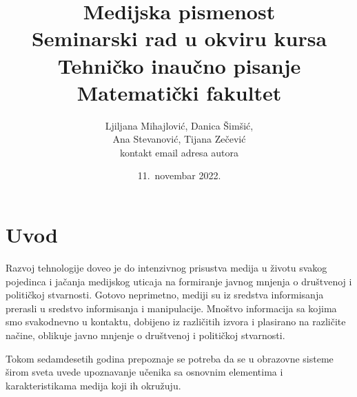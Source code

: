 \documentclass[a4paper]{article}
\begin{document}
\title{Medijska pismenost\\ \small{Seminarski rad u okviru kursa\\Tehničko inaučno pisanje\\ Matematički fakultet}}

\author{Ljiljana Mihajlović, Danica Šimšić,\\ Ana Stevanović, Tijana Zečević\\ kontakt email adresa autora}
\date{11.~novembar 2022.}
\maketitle



\tableofcontents

\newpage

\section{Uvod}
\label{sec:uvod}

Razvoj tehnologije doveo je do intenzivnog prisustva medija u životu svakog pojedinca i jačanja medijskog uticaja na formiranje javnog mnjenja o društvenoj i političkoj stvarnosti. Gotovo neprimetno, mediji su iz sredstva informisanja prerasli u sredstvo informisanja i manipulacije. Mnoštvo informacija sa kojima smo svakodnevno u kontaktu, dobijeno iz različitih izvora i plasirano na različite načine, oblikuje javno mnjenje o društvenoj i političkoj stvarnosti.

Tokom sedamdesetih godina prepoznaje se potreba da se u obrazovne sisteme širom sveta uvede upoznavanje učenika sa osnovnim elementima i karakteristikama medija koji ih okružuju. 
\end{document}
